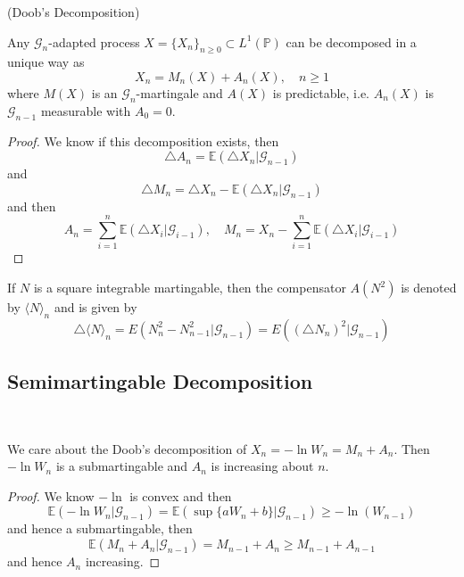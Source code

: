 \begin{theorem}
    (Doob's Decomposition)\par
    Any $\mathcal{G}_n$-adapted process $X = \{X_n\}_{n\geq 0} \subset L^1(\mathbb{P})$ can be decomposed in a unique way as
    \[
    X_n = M_n(X) + A_n(X),\quad n\geq 1
    \]
    where $M(X)$ is an $\mathcal{G}_n$-martingale and $A(X)$ is predictable, i.e. $A_n(X)$ is $\mathcal{G}_{n-1}$ measurable with $A_0 = 0$.
\end{theorem}
\begin{proof}
    We know if this decomposition exists, then
    \[
    \triangle A_n = \mathbb{E}(\triangle X_n|\mathcal{G}_{n-1})
    \]
    and
    \[
    \triangle M_n = \triangle X_n - \mathbb{E}(\triangle X_n|\mathcal{G}_{n-1})
    \]
    and then
    \[
    A_n = \sum\limits_{i=1}^n \mathbb{E}(\triangle X_i|\mathcal{G}_{i-1}),\quad M_n = X_n - \sum\limits_{i=1}^n \mathbb{E}(\triangle X_i|\mathcal{G}_{i-1})
    \]
\end{proof}

\begin{proposition}
    If $N$ is a square integrable martingable, then the compensator $A(N^2)$ is denoted by $\langle N\rangle_n$ and is given by
    \[
    \triangle\langle N \rangle_n = E(N^2_n - N^2_{n-1}|\mathcal{G}_{n-1}) = E((\triangle N_n)^2|\mathcal{G}_{n-1})
    \]
\end{proposition}

\subsection{Semimartingable Decomposition}

\begin{definition}\ \par
    We care about the Doob's decomposition of $X_n = -\ln W_n = M_n+A_n$. Then $-\ln W_n$ is a submartingable and $A_n$ is increasing about $n$.
\end{definition}
\begin{proof}
    We know $-\ln$ is convex and then
    \[
    \mathbb{E}(-\ln W_n|\mathcal{G}_{n-1}) = \mathbb{E}(\sup\{aW_n+b\}|\mathcal{G}_{n-1}) \geq -\ln(W_{n-1})
    \]
    and hence a submartingable, then
    \[
    \mathbb{E}(M_n+A_n|\mathcal{G}_{n-1}) = M_{n-1}+A_n \geq M_{n-1} + A_{n-1}
    \]
    and hence $A_n$ increasing.
\end{proof}

